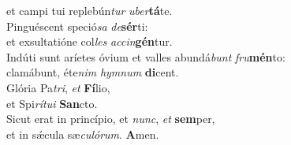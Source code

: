 \evenverse et campi tui replebún\textit{tur} \textit{u}\textit{ber}\textbf{tá}te.\\
\oddverse Pinguéscent speció\textit{sa} \textit{de}\textbf{sér}ti:~\*\\
\oddverse et exsultatióne col\textit{les} \textit{ac}\textit{cin}\textbf{gén}tur.\\
\evenverse Indúti sunt aríetes óvium et valles abundá\textit{bunt} \textit{fru}\textbf{mén}to:~\*\\
\evenverse clamábunt, éte\textit{nim} \textit{hym}\textit{num} \textbf{di}cent.\\
\oddverse Glória Pa\textit{tri}, \textit{et} \textbf{Fí}lio,~\*\\
\oddverse et Spi\textit{rí}\textit{tu}\textit{i} \textbf{San}cto.\\
\evenverse Sicut erat in princípio, et \textit{nunc}, \textit{et} \textbf{sem}per,~\*\\
\evenverse et in sǽcula sæ\textit{cu}\textit{ló}\textit{rum}. \textbf{A}men.\\
